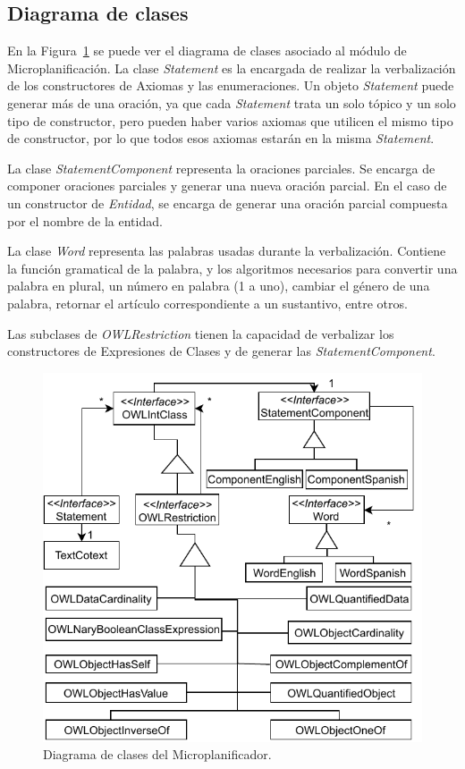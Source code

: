 \subsection{Diagrama de clases}
En la Figura~\ref{fig:diagrama_clases_microplanificador} se puede ver el diagrama de clases asociado al módulo de Microplanificación. 
La clase \emph{Statement} es la encargada de realizar la verbalización de los constructores de Axiomas y las enumeraciones. Un objeto \emph{Statement} puede generar más de una oración, ya que cada \emph{Statement} trata un solo tópico y un solo tipo de constructor, pero pueden haber varios axiomas que utilicen el mismo tipo de constructor, por lo que todos esos axiomas estarán en la misma \emph{Statement}.

La clase \emph{StatementComponent} representa la oraciones parciales. Se encarga de componer oraciones parciales y generar una nueva oración parcial. En el caso de un constructor de \textit{Entidad}, se encarga de generar una oración parcial compuesta por el nombre de la entidad.

La clase \emph{Word} representa las palabras usadas durante la verbalización. Contiene la función gramatical de la palabra, y los algoritmos necesarios para convertir una palabra en plural, un número en palabra (1 a uno), cambiar el género de una palabra, retornar el artículo correspondiente a un sustantivo, entre otros.

Las subclases de \emph{OWLRestriction} tienen la capacidad de verbalizar los constructores de Expresiones de Clases y de generar las \emph{StatementComponent}.

\begin{figure}
    \centering
    \includegraphics{img/generacion_documento/diagrama_clases_microplanificador.pdf}
    \caption{Diagrama de clases del Microplanificador.}
    \label{fig:diagrama_clases_microplanificador}
\end{figure}


